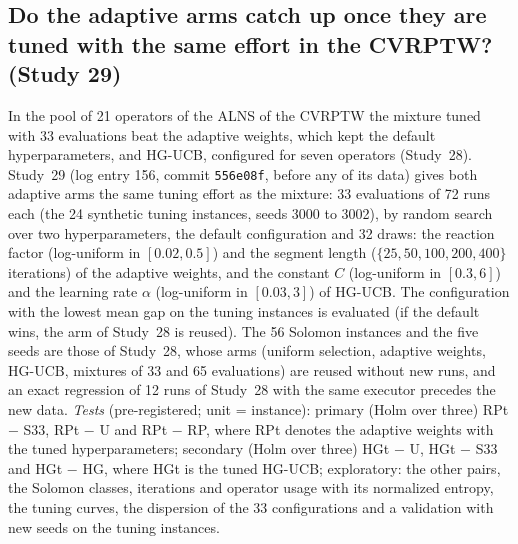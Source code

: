 \subsection{Do the adaptive arms catch up once they are tuned with the same effort in the CVRPTW? (Study 29)}\label{sec:s29design}
In the pool of 21 operators of the ALNS of the CVRPTW the mixture tuned with 33 evaluations beat the adaptive weights, which kept the default hyperparameters, and HG-UCB, configured for seven operators (Study~28). Study~29 (log entry 156, commit \texttt{556e08f}, before any of its data) gives both adaptive arms the same tuning effort as the mixture: 33 evaluations of 72 runs each (the 24 synthetic tuning instances, seeds 3000 to 3002), by random search over two hyperparameters, the default configuration and 32 draws: the reaction factor (log-uniform in $[0.02, 0.5]$) and the segment length ($\{25, 50, 100, 200, 400\}$ iterations) of the adaptive weights, and the constant $C$ (log-uniform in $[0.3, 6]$) and the learning rate $\alpha$ (log-uniform in $[0.03, 3]$) of HG-UCB. The configuration with the lowest mean gap on the tuning instances is evaluated (if the default wins, the arm of Study~28 is reused). The 56 Solomon instances and the five seeds are those of Study~28, whose arms (uniform selection, adaptive weights, HG-UCB, mixtures of 33 and 65 evaluations) are reused without new runs, and an exact regression of 12 runs of Study~28 with the same executor precedes the new data. \emph{Tests} (pre-registered; unit = instance): primary (Holm over three) RPt $-$ S33, RPt $-$ U and RPt $-$ RP, where RPt denotes the adaptive weights with the tuned hyperparameters; secondary (Holm over three) HGt $-$ U, HGt $-$ S33 and HGt $-$ HG, where HGt is the tuned HG-UCB; exploratory: the other pairs, the Solomon classes, iterations and operator usage with its normalized entropy, the tuning curves, the dispersion of the 33 configurations and a validation with new seeds on the tuning instances.

